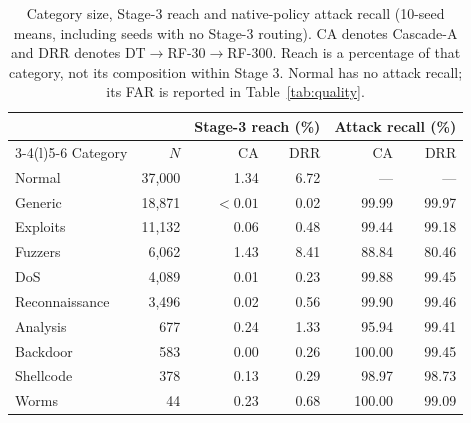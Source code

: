 \begin{table}[!htbp]
\centering
\caption{Category size, Stage-3 reach and native-policy attack recall (10-seed means, including seeds with no Stage-3 routing). CA denotes Cascade-A and DRR denotes DT$\to$RF-30$\to$RF-300. Reach is a percentage of that category, not its composition within Stage 3. Normal has no attack recall; its FAR is reported in Table~\ref{tab:quality}.}
\label{tab:categories}
\small
\setlength{\tabcolsep}{4pt}
\begin{tabularx}{\textwidth}{@{}Xrrrrr@{}}
\toprule
 & & \multicolumn{2}{c}{Stage-3 reach (\%)} & \multicolumn{2}{c}{Attack recall (\%)} \\ \cmidrule(lr){3-4}\cmidrule(l){5-6} Category & $N$ & CA & DRR & CA & DRR \\
\midrule
Normal & 37,000 & 1.34 & 6.72 & --- & --- \\
Generic & 18,871 & $<0.01$ & 0.02 & 99.99 & 99.97 \\
Exploits & 11,132 & 0.06 & 0.48 & 99.44 & 99.18 \\
Fuzzers & 6,062 & 1.43 & 8.41 & 88.84 & 80.46 \\
DoS & 4,089 & 0.01 & 0.23 & 99.88 & 99.45 \\
Reconnaissance & 3,496 & 0.02 & 0.56 & 99.90 & 99.46 \\
Analysis & 677 & 0.24 & 1.33 & 95.94 & 99.41 \\
Backdoor & 583 & 0.00 & 0.26 & 100.00 & 99.45 \\
Shellcode & 378 & 0.13 & 0.29 & 98.97 & 98.73 \\
Worms & 44 & 0.23 & 0.68 & 100.00 & 99.09 \\
\bottomrule
\end{tabularx}
\end{table}
